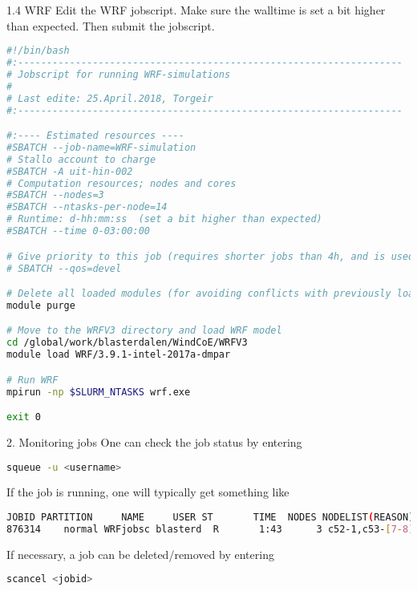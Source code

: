 \documentclass[xcolor=table]{beamer}
\begin{document}
\begin{frame}[fragile, allowframebreaks=.99, t]{1.4 WRF}
Edit the WRF jobscript. Make sure the walltime is set a bit higher than expected. Then submit the jobscript.
\begin{lstlisting}[backgroundcolor = \color{light-gray}, language=bash]
#!/bin/bash
#:-------------------------------------------------------------------
# Jobscript for running WRF-simulations 
#
# Last edite: 25.April.2018, Torgeir
#:-------------------------------------------------------------------

#:---- Estimated resources ----
#SBATCH --job-name=WRF-simulation
# Stallo account to charge
#SBATCH -A uit-hin-002
# Computation resources; nodes and cores
#SBATCH --nodes=3
#SBATCH --ntasks-per-node=14
# Runtime: d-hh:mm:ss  (set a bit higher than expected)
#SBATCH --time 0-03:00:00

# Give priority to this job (requires shorter jobs than 4h, and is used for testing scripts)
# SBATCH --qos=devel

# Delete all loaded modules (for avoiding conflicts with previously loaded modules)
module purge

# Move to the WRFV3 directory and load WRF model
cd /global/work/blasterdalen/WindCoE/WRFV3
module load WRF/3.9.1-intel-2017a-dmpar

# Run WRF
mpirun -np $SLURM_NTASKS wrf.exe

exit 0
\end{lstlisting}

\end{frame}





\begin{frame}[fragile]{2. Monitoring jobs}
One can check the job status by entering 
\begin{lstlisting}[backgroundcolor = \color{light-gray}, language=bash]
squeue -u <username>
\end{lstlisting}
If the job is running, one will typically get something like 
\begin{minipage}[c]{1.05\textwidth}
\begin{lstlisting}[backgroundcolor = \color{light-gray}, language=bash]
JOBID PARTITION     NAME     USER ST       TIME  NODES NODELIST(REASON)
876314    normal WRFjobsc blasterd  R       1:43      3 c52-1,c53-[7-8]
\end{lstlisting}
\end{minipage}
If necessary, a job can be deleted/removed by entering 
\begin{lstlisting}[backgroundcolor = \color{light-gray}, language=bash]
scancel <jobid>
\end{lstlisting}
\end{frame}
\end{document}

